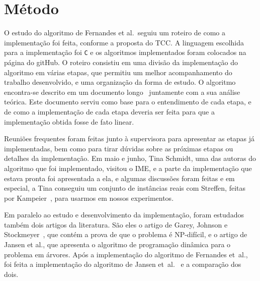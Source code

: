 \documentclass[a4paper,12pt]{article}
\begin{document}
\newpage



\section{Método}

O estudo do algoritmo de Fernandes et al.\ seguiu um roteiro de
como a implementação foi feita, conforme a proposta do TCC. 
A linguagem escolhida para a implementação foi \texttt{C} e os 
algoritmos implementados foram colocados na página do gitHub. 
O roteiro consistiu em uma divisão da implementação do algoritmo 
em várias etapas, que permitiu um melhor acompanhamento do 
trabalho desenvolvido, e uma organização da forma de estudo. 
O algoritmo encontra-se descrito em um documento 
longo~\cite{Schmidt15} juntamente com a sua análise teórica. 
Este documento serviu como base para o entendimento de cada 
etapa, e de como a implementação de cada etapa deveria ser feita 
para que a implementação obtida fosse de fato linear. 

Reuniões frequentes foram feitas junto à supervisora para 
apresentar as etapas já implementadas, bem como para tirar dúvidas 
sobre as próximas etapas ou detalhes da implementação. 
Em maio e junho, Tina Schmidt, uma das autoras do algoritmo que 
foi implementado, visitou o IME, e a parte da 
implementação que estava pronta foi apresentada a ela, e 
algumas discussões foram feitas e em especial, a Tina conseguiu
um conjunto de instâncias reais com Streffen, feitas por 
Kampeier~\cite{Kampmeier}, para usarmos 
em nossos experimentos.   

Em paralelo ao estudo e desenvolvimento da implementação, foram 
estudados também dois artigos da literatura. São eles o artigo 
de Garey, 
Johnson e Stockmeyer~\cite{GareyJS76}, que contém a prova de que o 
problema é NP-difícil, e o artigo de Jansen et al., que apresenta 
o algoritmo de programação dinâmica para o problema em árvores. 
Após a implementação do algoritmo de Fernandes et~al., foi feita 
a implementação do algoritmo de Jansen et~al.~\cite{JansenKLS01} e a comparação dos 
dois. 

\newpage

\end{document}

